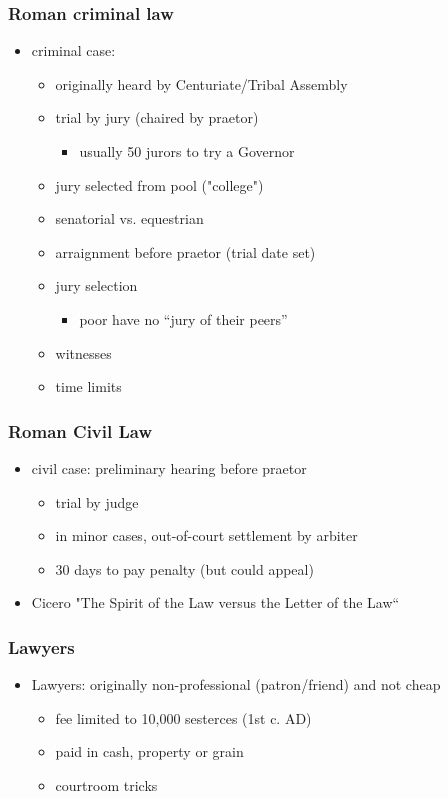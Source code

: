 \documentclass[12pt, twoside]{article}
\begin{document}
\subsubsection{Roman criminal law}
\begin{itemize}
\item criminal case:
	\begin{itemize}
	\item  originally heard by Centuriate/Tribal Assembly
	\item trial by jury (chaired by praetor)
		\begin{itemize}
		\item usually 50 jurors to try a Governor
		\end{itemize}
	\item jury selected from pool ("college")
	\item senatorial vs. equestrian
	\item arraignment before praetor (trial date set)
	\item jury selection
		\begin{itemize}
		\item poor have no “jury of their peers”
		\end{itemize}
	\item witnesses
	\item time limits
	\end{itemize}
\end{itemize}

\subsubsection{Roman Civil Law}
\begin{itemize}
\item civil case: preliminary hearing before praetor
	\begin{itemize}
	\item trial by judge
	\item in minor cases, out-of-court settlement by arbiter
	\item 30 days to pay penalty (but could appeal)
	\end{itemize}
\item Cicero "The Spirit of the Law versus the Letter of the Law“
\end{itemize}
\subsubsection{Lawyers}
\begin{itemize}
\item Lawyers: originally non-professional (patron/friend) and not cheap
	\begin{itemize}
	\item fee limited to 10,000 sesterces (1st c. AD)
	\item paid in cash, property or grain
	\item courtroom tricks
	\end{itemize}
\end{itemize}
\end{document}
